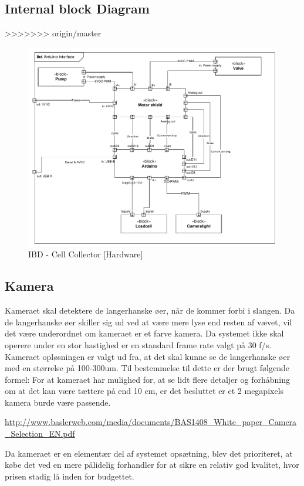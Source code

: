 \subsection{Internal block Diagram} 
>>>>>>> origin/master
\begin{figure}[H]
	\centering
	\includegraphics[width=1\textwidth]{pdf/IBD_Hardware(Arduino)_cropped.pdf}
	\caption{IBD - Cell Collector [Hardware]}
	\label{fig:ibd_Hardware}
\end{figure}



\subsection{Kamera}
Kameraet skal detektere de langerhanske øer, når de kommer forbi i slangen.  Da de langerhanske øer skiller sig ud ved at være mere lyse end resten af vævet, vil det være underordnet om kameraet er et farve kamera. Da systemet ikke skal operere under en stor hastighed er en standard frame rate valgt på 30 f/s. Kameraet opløsningen er valgt ud fra, at det skal kunne se de langerhanske øer med en størrelse på 100-300um. Til bestemmelse til dette er der brugt følgende formel:
For at kameraet har mulighed for, at se lidt flere detaljer og forhåbning om at det kan være tættere på end 10 cm, er det besluttet er et 2 megapixels kamera burde være passende.

\url{http://www.baslerweb.com/media/documents/BAS1408_White_paper_Camera_Selection_EN.pdf}


Da kameraet er en elementær del af systemet opsætning, blev det prioriteret, at købe det ved en mere pålidelig forhandler for at sikre en relativ god kvalitet, hvor prisen stadig lå inden for budgettet.  

